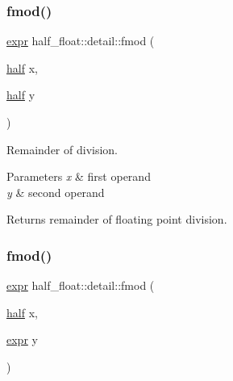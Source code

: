 \mbox{\label{namespacehalf__float_1_1detail_a935147b16040f424271a380e274577ee}} 
\subsubsection{\texorpdfstring{fmod()}{fmod()}\hspace{0.1cm}{\footnotesize\ttfamily [1/4]}}
{\footnotesize\ttfamily \hyperlink{structhalf__float_1_1detail_1_1expr}{expr} half\+\_\+float\+::detail\+::fmod (\begin{DoxyParamCaption}\item[{\hyperlink{classhalf__float_1_1half}{half}}]{x,  }\item[{\hyperlink{classhalf__float_1_1half}{half}}]{y }\end{DoxyParamCaption})\hspace{0.3cm}{\ttfamily [inline]}}

Remainder of division. 
\begin{DoxyParams}{Parameters}
{\em x} & first operand \\
\hline
{\em y} & second operand \\
\hline
\end{DoxyParams}
\begin{DoxyReturn}{Returns}
remainder of floating point division. 
\end{DoxyReturn}
\mbox{\label{namespacehalf__float_1_1detail_a2a98a82b2c995cbf00d5a8aeca3e1104}} 
\subsubsection{\texorpdfstring{fmod()}{fmod()}\hspace{0.1cm}{\footnotesize\ttfamily [2/4]}}
{\footnotesize\ttfamily \hyperlink{structhalf__float_1_1detail_1_1expr}{expr} half\+\_\+float\+::detail\+::fmod (\begin{DoxyParamCaption}\item[{\hyperlink{classhalf__float_1_1half}{half}}]{x,  }\item[{\hyperlink{structhalf__float_1_1detail_1_1expr}{expr}}]{y }\end{DoxyParamCaption})\hspace{0.3cm}{\ttfamily [inline]}}

